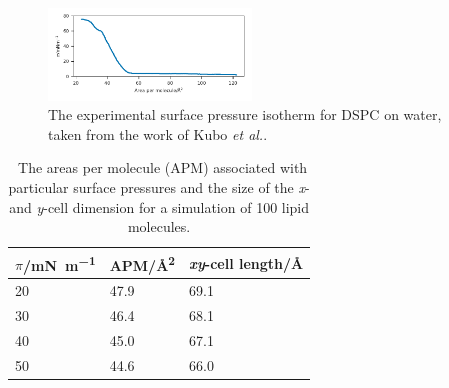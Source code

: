 \documentclass[amsmath,amssymb,twocolumn,superscriptaddress]{revtex4-1}
\begin{document}
%
%
\begin{figure}[h]
\centering
  \includegraphics[width=0.48\textwidth]{apm}
  \caption{The experimental surface pressure isotherm for DSPC on water, taken from
  the work of Kubo \emph{et al.}\cite{kubo_phosphatidylcholine_2001}.}
  \label{fig:iso}
\end{figure}
%
%
\begin{table}[h]
\small
  \caption{\ The areas per molecule (APM) associated with particular surface
  pressures and the size of the \emph{x}- and \emph{y}-cell dimension for a
  simulation of 100 lipid molecules.}
  \label{tbl:apm}
  \begin{tabular*}{0.48\textwidth}{@{\extracolsep{\fill}}lll}
    \hline
    $\pi$/\si{\milli\newton\per\meter} & APM/\si{\angstrom\squared} &
    \emph{xy}-cell length/\si{\angstrom} \\
    \hline
    20 & 47.9 & 69.1 \\
    30 & 46.4 & 68.1 \\
    40 & 45.0 & 67.1 \\
    50 & 44.6 & 66.0 \\
    \hline
  \end{tabular*}
\end{table}
%
\end{document}
